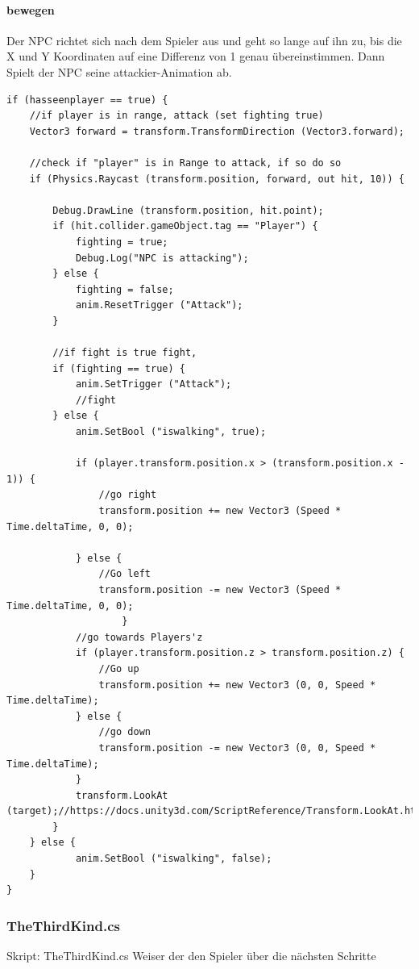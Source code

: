 \paragraph{bewegen }
Der NPC richtet sich nach dem Spieler aus und geht so lange auf ihn zu, bis die X und Y Koordinaten auf eine Differenz von 1 genau übereinstimmen.
Dann Spielt der NPC seine attackier-Animation ab.
\begin{lstlisting}
if (hasseenplayer == true) {	
	//if player is in range, attack (set fighting true)
	Vector3 forward = transform.TransformDirection (Vector3.forward);

	//check if "player" is in Range to attack, if so do so
	if (Physics.Raycast (transform.position, forward, out hit, 10)) {	

		Debug.DrawLine (transform.position, hit.point);
		if (hit.collider.gameObject.tag == "Player") {
			fighting = true;
			Debug.Log("NPC is attacking");
		} else {
			fighting = false;
			anim.ResetTrigger ("Attack");
		}

		//if fight is true fight,
		if (fighting == true) {
			anim.SetTrigger ("Attack");
			//fight
		} else {	
			anim.SetBool ("iswalking", true);
					
			if (player.transform.position.x > (transform.position.x - 1)) {
				//go right
				transform.position += new Vector3 (Speed * Time.deltaTime, 0, 0);
            		
			} else {
				//Go left
				transform.position -= new Vector3 (Speed * Time.deltaTime, 0, 0);
					}
			//go towards Players'z
			if (player.transform.position.z > transform.position.z) {
				//Go up
				transform.position += new Vector3 (0, 0, Speed * Time.deltaTime);
			} else {
				//go down
				transform.position -= new Vector3 (0, 0, Speed * Time.deltaTime);
			}
			transform.LookAt (target);//https://docs.unity3d.com/ScriptReference/Transform.LookAt.html
		}
	} else {
			anim.SetBool ("iswalking", false);
	}
}

\end{lstlisting}
\subsubsection{TheThirdKind.cs}
Skript: TheThirdKind.cs
Weiser der den Spieler über die nächsten Schritte

